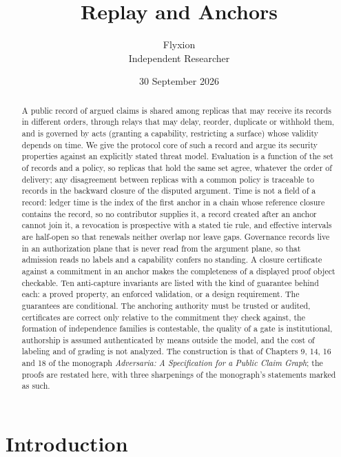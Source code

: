 \documentclass[11pt]{article}
\title{Replay and Anchors}
\author{Flyxion\\\small Independent Researcher}
\date{30 September 2026}
\theoremstyle{plain}
\theoremstyle{definition}
\theoremstyle{remark}
\begin{document}
\maketitle

\begin{abstract}
\noindent
A public record of argued claims is shared among replicas that may receive its records in different orders, through relays that may delay, reorder, duplicate or withhold them, and is governed by acts (granting a capability, restricting a surface) whose validity depends on time. We give the protocol core of such a record and argue its security properties against an explicitly stated threat model. Evaluation is a function of the set of records and a policy, so replicas that hold the same set agree, whatever the order of delivery; any disagreement between replicas with a common policy is traceable to records in the backward closure of the disputed argument. Time is not a field of a record: ledger time is the index of the first anchor in a chain whose reference closure contains the record, so no contributor supplies it, a record created after an anchor cannot join it, a revocation is prospective with a stated tie rule, and effective intervals are half-open so that renewals neither overlap nor leave gaps. Governance records live in an authorization plane that is never read from the argument plane, so that admission reads no labels and a capability confers no standing. A closure certificate against a commitment in an anchor makes the completeness of a displayed proof object checkable. Ten anti-capture invariants are listed with the kind of guarantee behind each: a proved property, an enforced validation, or a design requirement. The guarantees are conditional. The anchoring authority must be trusted or audited, certificates are correct only relative to the commitment they check against, the formation of independence families is contestable, the quality of a gate is institutional, authorship is assumed authenticated by means outside the model, and the cost of labeling and of grading is not analyzed. The construction is that of Chapters 9, 14, 16 and 18 of the monograph \emph{Adversaria: A Specification for a Public Claim Graph}; the proofs are restated here, with three sharpenings of the monograph's statements marked as such.
\end{abstract}

\section{Introduction}\label{sec:intro}
\end{document}
